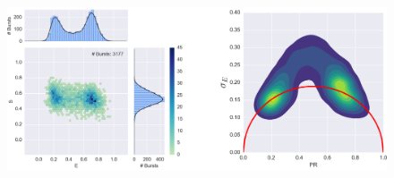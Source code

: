 \begin{figure}
\begin{center}
\includegraphics[width=\doublefig]{"figures/HP3_RT_400mM_NaCl_ALEX_BVA2/HP3_RT_400mM_NaCl_ALEX_BVA2"}
\caption[]{}
\end{center}
\end{figure}








